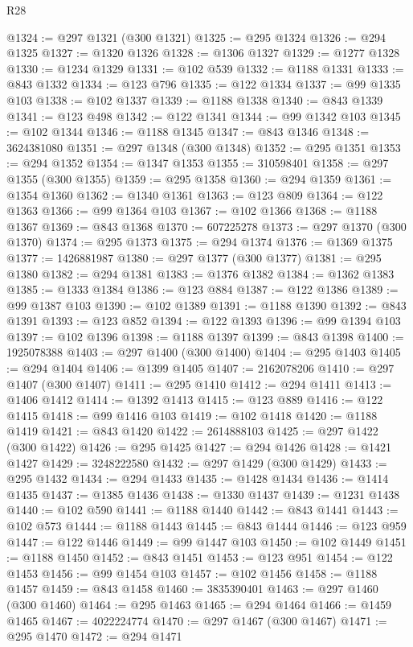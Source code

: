\begin{lexlean}{R28}
\begin{coremodule}
@1324 := @297 @1321 (@300 @1321)
@1325 := @295 @1324
@1326 := @294 @1325
@1327 := @1320 @1326
@1328 := @1306 @1327
@1329 := @1277 @1328
@1330 := @1234 @1329
@1331 := @102 @539
@1332 := @1188 @1331
@1333 := @843 @1332
@1334 := @123 @796
@1335 := @122 @1334
@1337 := @99 @1335 @103
@1338 := @102 @1337
@1339 := @1188 @1338
@1340 := @843 @1339
@1341 := @123 @498
@1342 := @122 @1341
@1344 := @99 @1342 @103
@1345 := @102 @1344
@1346 := @1188 @1345
@1347 := @843 @1346
@1348 := 3624381080
@1351 := @297 @1348 (@300 @1348)
@1352 := @295 @1351
@1353 := @294 @1352
@1354 := @1347 @1353
@1355 := 310598401
@1358 := @297 @1355 (@300 @1355)
@1359 := @295 @1358
@1360 := @294 @1359
@1361 := @1354 @1360
@1362 := @1340 @1361
@1363 := @123 @809
@1364 := @122 @1363
@1366 := @99 @1364 @103
@1367 := @102 @1366
@1368 := @1188 @1367
@1369 := @843 @1368
@1370 := 607225278
@1373 := @297 @1370 (@300 @1370)
@1374 := @295 @1373
@1375 := @294 @1374
@1376 := @1369 @1375
@1377 := 1426881987
@1380 := @297 @1377 (@300 @1377)
@1381 := @295 @1380
@1382 := @294 @1381
@1383 := @1376 @1382
@1384 := @1362 @1383
@1385 := @1333 @1384
@1386 := @123 @884
@1387 := @122 @1386
@1389 := @99 @1387 @103
@1390 := @102 @1389
@1391 := @1188 @1390
@1392 := @843 @1391
@1393 := @123 @852
@1394 := @122 @1393
@1396 := @99 @1394 @103
@1397 := @102 @1396
@1398 := @1188 @1397
@1399 := @843 @1398
@1400 := 1925078388
@1403 := @297 @1400 (@300 @1400)
@1404 := @295 @1403
@1405 := @294 @1404
@1406 := @1399 @1405
@1407 := 2162078206
@1410 := @297 @1407 (@300 @1407)
@1411 := @295 @1410
@1412 := @294 @1411
@1413 := @1406 @1412
@1414 := @1392 @1413
@1415 := @123 @889
@1416 := @122 @1415
@1418 := @99 @1416 @103
@1419 := @102 @1418
@1420 := @1188 @1419
@1421 := @843 @1420
@1422 := 2614888103
@1425 := @297 @1422 (@300 @1422)
@1426 := @295 @1425
@1427 := @294 @1426
@1428 := @1421 @1427
@1429 := 3248222580
@1432 := @297 @1429 (@300 @1429)
@1433 := @295 @1432
@1434 := @294 @1433
@1435 := @1428 @1434
@1436 := @1414 @1435
@1437 := @1385 @1436
@1438 := @1330 @1437
@1439 := @1231 @1438
@1440 := @102 @590
@1441 := @1188 @1440
@1442 := @843 @1441
@1443 := @102 @573
@1444 := @1188 @1443
@1445 := @843 @1444
@1446 := @123 @959
@1447 := @122 @1446
@1449 := @99 @1447 @103
@1450 := @102 @1449
@1451 := @1188 @1450
@1452 := @843 @1451
@1453 := @123 @951
@1454 := @122 @1453
@1456 := @99 @1454 @103
@1457 := @102 @1456
@1458 := @1188 @1457
@1459 := @843 @1458
@1460 := 3835390401
@1463 := @297 @1460 (@300 @1460)
@1464 := @295 @1463
@1465 := @294 @1464
@1466 := @1459 @1465
@1467 := 4022224774
@1470 := @297 @1467 (@300 @1467)
@1471 := @295 @1470
@1472 := @294 @1471

\end{coremodule}
\end{lexlean}
